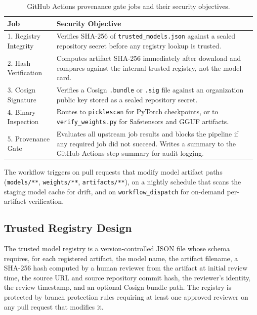 \documentclass[preprint,12pt,twocolumn]{elsarticle}
\begin{document}
\begin{table}[ht]
\caption{GitHub Actions provenance gate jobs and their security objectives.}
\label{tab:pipeline}
\renewcommand{\arraystretch}{1.25}
\begin{tabularx}{\columnwidth}{lX}
\toprule
\textbf{Job} & \textbf{Security Objective} \\
\midrule
1. Registry Integrity &
  Verifies SHA-256 of \texttt{trusted\_models.json} against a sealed
  repository secret before any registry lookup is trusted. \\
2. Hash Verification &
  Computes artifact SHA-256 immediately after download and compares
  against the internal trusted registry, not the model card. \\
3. Cosign Signature &
  Verifies a Cosign \texttt{.bundle} or \texttt{.sig} file against an
  organization public key stored as a sealed repository secret. \\
4. Binary Inspection &
  Routes to \texttt{picklescan} for PyTorch checkpoints, or to
  \texttt{verify\_weights.py} for Safetensors and GGUF artifacts. \\
5. Provenance Gate &
  Evaluates all upstream job results and blocks the pipeline if any
  required job did not succeed. Writes a summary to the GitHub
  Actions step summary for audit logging. \\
\bottomrule
\end{tabularx}
\end{table}

The workflow triggers on pull requests that modify model artifact paths
(\texttt{models/**}, \texttt{weights/**}, \texttt{artifacts/**}), on a
nightly schedule that scans the staging model cache for drift, and on
\texttt{workflow\_dispatch} for on-demand per-artifact verification.

\subsection{Trusted Registry Design}

The trusted model registry is a version-controlled JSON file whose schema
requires, for each registered artifact, the model name, the artifact
filename, a SHA-256 hash computed by a human reviewer from the artifact
at initial review time, the source URL and source repository commit hash,
the reviewer's identity, the review timestamp, and an optional Cosign
bundle path. The registry is protected by branch protection rules requiring
at least one approved reviewer on any pull request that modifies it.
\end{document}
